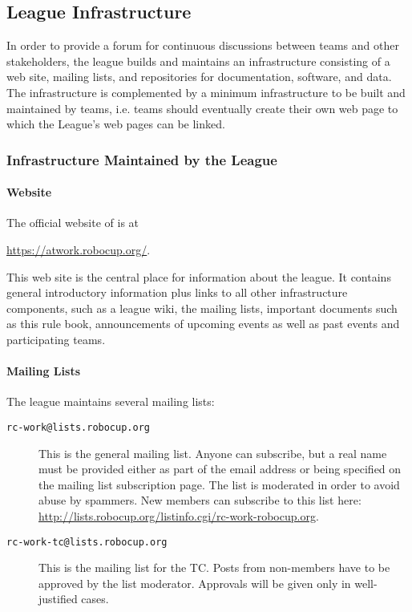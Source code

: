 \subsection{League Infrastructure}
In order to provide a forum for continuous discussions between teams and other stakeholders, the league builds and maintains an infrastructure consisting of a web site, mailing lists, and repositories for documentation, software, and data. The infrastructure is complemented by a minimum infrastructure to be built and maintained by teams, i.e. teams should eventually create their own web page to which the \RCAW League's web pages can be linked.

\subsubsection{Infrastructure Maintained by the League} \label{ssec:LeagueInfrastructure}

\paragraph{Website}
The official website of \RCAW is at
\begin{center}
\url{https://atwork.robocup.org/}.
\end{center}

This web site is the central place for information about the league. It contains general introductory information plus links to all other infrastructure components, such as a league wiki, the mailing lists, important documents such as this rule book, announcements of upcoming events as well as past events and participating teams.

\paragraph{Mailing Lists}
The league maintains several mailing lists:
\begin{description}
	\item[\texttt{rc-work@lists.robocup.org}] This is the general \RCAW mailing list. Anyone can subscribe, but a real name must be provided either as part of the email address or being specified on the mailing list subscription page. The list is moderated in order to avoid abuse by spammers. New members can subscribe to this list here: \url{http://lists.robocup.org/listinfo.cgi/rc-work-robocup.org}.

	\item[\texttt{rc-work-tc@lists.robocup.org}] This is the mailing list for the TC. Posts from non-members have to be approved by the list moderator. Approvals will be given only in well-justified cases.
\end{description}

